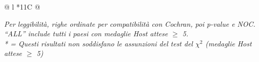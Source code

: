 \begin{table}[H]
\begin{tabularx}{\textwidth}{@{} l *{11}{C} @{}}
\bottomrule
{}\\
\end{tabularx}
\vspace{2pt}
\raggedright
\small
\textit{Per leggibilità, righe ordinate per compatibilità con Cochran, poi p-value e NOC.}\\
\textit{``ALL'' include tutti i paesi con medaglie Host attese $\ge$ 5.}\\
\textit{* = Questi risultati non soddisfano le assunzioni del test del $\chi^2$ (medaglie Host attese $\ge$ 5)}
\end{table}




